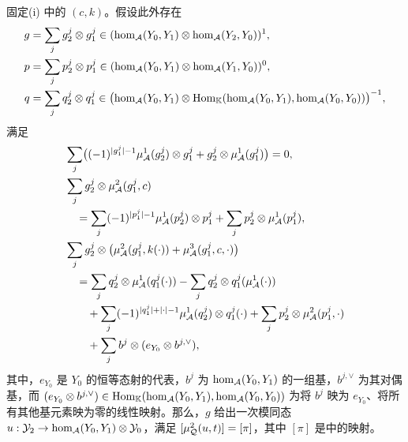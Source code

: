 \begin{lemma}\label{st:5.4}
固定\textup{(i)} 中的 $(c,k)$。假设此外存在
\[
\begin{aligned}
g&=\sum_jg_2^j\otimes g_1^j\in(\hom_{\mathcal A}(Y_0,Y_1)\otimes\hom_{\mathcal A}(Y_2,Y_0))^1,\\
p&=\sum_jp_2^j\otimes p_1^j\in(\hom_{\mathcal A}(Y_0,Y_1)\otimes\hom_{\mathcal A}(Y_1,Y_0))^0,\\
q&=\sum_jq_2^j\otimes q_1^j\in\bigl(\hom_{\mathcal A}(Y_0,Y_1)\otimes\operatorname{Hom}_{\mathbb K}(\hom_{\mathcal A}(Y_0,Y_1),\hom_{\mathcal A}(Y_0,Y_0))\bigr)^{-1},
\end{aligned}
\]
满足
\[
\begin{aligned}
&\sum_j\bigl((-1)^{|g_1^j|-1}\mu^1_{\mathcal A}(g_2^j)\otimes g_1^j+g_2^j\otimes\mu^1_{\mathcal A}(g_1^j)\bigr)=0,\\
&\sum_jg_2^j\otimes\mu^2_{\mathcal A}(g_1^j,c)\\
&\quad=\sum_j(-1)^{|p_1^j|-1}\mu^1_{\mathcal A}(p_2^j)\otimes p_1^j+\sum_jp_2^j\otimes\mu^1_{\mathcal A}(p_1^j),\\
&\sum_jg_2^j\otimes\bigl(\mu^2_{\mathcal A}(g_1^j,k(\cdot))+\mu^3_{\mathcal A}(g_1^j,c,\cdot)\bigr)\\
&\quad=\sum_jq_2^j\otimes\mu^1_{\mathcal A}(q_1^j(\cdot))-\sum_jq_2^j\otimes q_1^j(\mu^1_{\mathcal A}(\cdot))\\
&\qquad+\sum_j(-1)^{|q_1^j|+|\cdot|-1}\mu^1_{\mathcal A}(q_2^j)\otimes q_1^j(\cdot)+\sum_jp_2^j\otimes\mu^2_{\mathcal A}(p_1^j,\cdot)\\
&\qquad+\sum_j b^j\otimes(e_{Y_0}\otimes b^{j,\vee}),
\end{aligned}
\]
其中，$e_{Y_0}$ 是 $Y_0$ 的恒等态射的代表，$b^j$ 为 $\hom_{\mathcal A}(Y_0,Y_1)$ 的一组基，$b^{j,\vee}$ 为其对偶基，而 $(e_{Y_0}\otimes b^{j,\vee})\in\operatorname{Hom}_{\mathbb K}(\hom_{\mathcal A}(Y_0,Y_1),\hom_{\mathcal A}(Y_0,Y_0))$ 为将 $b^j$ 映为 $e_{Y_0}$、将所有其他基元素映为零的线性映射。那么，$g$ 给出一次模同态 $u:\mathcal Y_2\to\hom_{\mathcal A}(Y_0,Y_1)\otimes\mathcal Y_0$，满足 $[\mu^2_{\mathcal Q}(u,t)]=[\pi]$，其中 $[\pi]$ 是中的映射。
\end{lemma}
